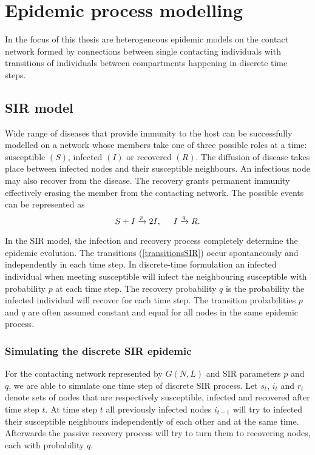 \documentclass[times, utf8, diplomski]{fer}
\begin{document}
\chapter{Epidemic process modelling}
\label{EPM}
In the focus of this thesis are heterogeneous epidemic models on the contact network formed by connections between single contacting individuals with transitions of individuals between compartments happening in discrete time steps.

\section{SIR model}
Wide range of diseases that provide immunity to the host can be successfully modelled on a network whose members take 	one of three possible roles at a time: susceptible $(S)$, infected $(I)$ or recovered $(R)$. The diffusion of disease takes place between infected nodes and their susceptible neighbours. An infectious node may also recover from the disease. The recovery grants permanent immunity effectively erasing the member from the contacting network.  The possible events can be represented as 
\begin{equation}
S + I \xrightarrow{p} 2I,\hspace{5mm}  I \xrightarrow{q} R.
\label{transitionsSIR}
\end{equation}

In the SIR model, the infection and recovery process completely determine the epidemic evolution. The transitions (\ref{transitionsSIR}) occur spontaneously and independently in each time step. In discrete-time formulation an infected individual when meeting susceptible will infect the neighbouring susceptible with probability $p$ at each time step. The recovery probability $q$ is the probability the infected individual will recover for each time step. The transition probabilities $p$ and $q$ are often assumed constant and equal for all nodes in the same epidemic process. 

\subsection{Simulating the discrete SIR epidemic}

For the contacting network represented by $G(N, L)$ and SIR parameters $p$ and $q$, we are able to simulate one time step of discrete SIR process. Let $s_t$, $i_t$ and $r_t$ denote sets of nodes that are respectively susceptible, infected and recovered after time step $t$. At time step $t$ all previously infected nodes $i_{t - 1}$ will try to infected their susceptible neighbours independently of each other and at the same time. Afterwards the passive recovery process will try to turn them to recovering nodes, each with probability $q$.
\end{document}
